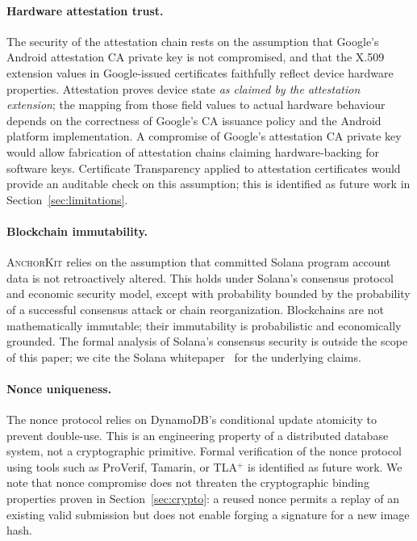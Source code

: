 \documentclass[11pt,a4paper]{article}
\newcommand{\AK}{\textsc{AnchorKit}\xspace}
\begin{document}
\paragraph{Hardware attestation trust.} The security of the attestation chain
rests on the assumption that Google's Android attestation CA private key is not
compromised, and that the X.509 extension values in Google-issued certificates
faithfully reflect device hardware properties.  Attestation proves device state
\emph{as claimed by the attestation extension}; the mapping from those field
values to actual hardware behaviour depends on the correctness of Google's CA
issuance policy and the Android platform implementation.  A compromise of
Google's attestation CA private key would allow fabrication of attestation
chains claiming hardware-backing for software keys.  Certificate Transparency
applied to attestation certificates would provide an auditable check on this
assumption; this is identified as future work in Section~\ref{sec:limitations}.

\paragraph{Blockchain immutability.} \AK relies on the assumption that committed
Solana program account data is not retroactively altered.  This holds under
Solana's consensus protocol and economic security model, except with probability
bounded by the probability of a successful consensus attack or chain
reorganization.  Blockchains are not mathematically immutable; their immutability
is probabilistic and economically grounded.  The formal analysis of Solana's
consensus security is outside the scope of this paper; we cite the Solana
whitepaper~\cite{solana18} for the underlying claims.

\paragraph{Nonce uniqueness.} The nonce protocol relies on DynamoDB's conditional
update atomicity to prevent double-use.  This is an engineering property of a
distributed database system, not a cryptographic primitive.  Formal verification
of the nonce protocol using tools such as ProVerif, Tamarin, or
TLA$^+$ is identified as future work.  We note that nonce compromise does not
threaten the cryptographic binding properties proven in
Section~\ref{sec:crypto}: a reused nonce permits a replay of an existing valid
submission but does not enable forging a signature for a new image hash.
\end{document}
